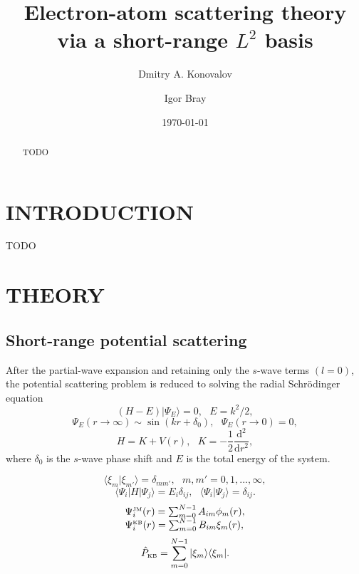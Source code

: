 \documentclass[aip
, pra
, showpacs
, aps
, twocolumn
, groupedaddress
, floatfix
]{revtex4}
\newcommand{\beq}{\begin{equation}}
\newcommand{\eeq}{\end{equation}}
\newcommand{\barr}{\begin{array}}
\newcommand{\earr}{\end{array}}
\newcommand{\JM}{\mbox{\tiny{JM}}}
\newcommand{\KB}{\mbox{\tiny{KB}}}
\begin{document}
\title {Electron-atom scattering theory via a short-range $L^2$ basis}

\author{Dmitry A. Konovalov}

\author{Igor Bray}


\date{\today}

\begin{abstract}
TODO

\end{abstract}

\maketitle

\section{INTRODUCTION}
TODO

\section{THEORY}
\subsection{Short-range potential scattering}
After the partial-wave expansion and retaining only the $s$-wave terms $(l=0)$, the potential scattering problem is reduced \cite{LL85, Taylor72} to solving the radial Schr\"odinger equation
\beq
(H-E) | \Psi_E \rangle =0, \ \ \ E=k^2/2,
\eeq
\beq
\Psi_E(r \rightarrow \infty) \sim \sin(kr+\delta_0), \ \ \ \Psi_E(r \rightarrow 0)=0,
\eeq
\beq
H=K+V(r), \ \ \ K=-\frac{1}{2} \frac{\mbox{d}^2}{\mbox{d}r^2}, \label{K}
\eeq
where $\delta_0$ is the $s$-wave phase shift and $E$ is the total energy of the system.

\beq
\langle \xi_m | \xi_{m'} \rangle=\delta_{mm'}, \ \ \ m,m'=0,1,...,\infty,
\eeq
\beq
\langle \Psi_i |H| \Psi_j \rangle = E_i \delta_{ij} , \ \ \ \langle \Psi_i | \Psi_j \rangle=\delta_{ij}. 
\eeq
\beq \barr{l}
\Psi_i^{\JM}(r) = \sum_{m=0}^{N-1} A_{im} \phi_m(r), \\
\Psi_i^{\KB}(r) = \sum_{m=0}^{N-1} B_{im} \xi_m(r),
\earr \eeq
\beq
\hat{P}_{\KB} = \sum_{m=0}^{N-1} | \xi_m \rangle \langle \xi_m |.
\eeq
\end{document}
